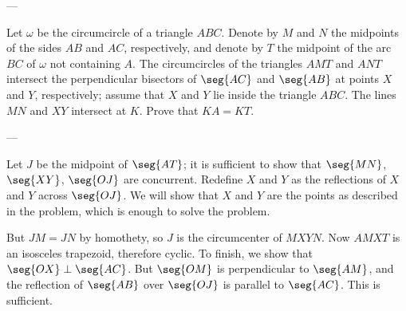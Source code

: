 
---

Let $\omega$ be the circumcircle of a triangle $ABC$. Denote by $M$ and $N$ the midpoints of the sides $AB$ and $AC$, respectively, and denote by $T$ the midpoint of the arc $BC$ of $\omega$ not containing $A$. The circumcircles of the triangles $AMT$ and $ANT$ intersect the perpendicular bisectors of $\seg{AC}$ and $\seg{AB}$ at points $X$ and $Y$, respectively; assume that $X$ and $Y$ lie inside the triangle $ABC$. The lines $MN$ and $XY$ intersect at $K$. Prove that $KA=KT$.

---

Let $J$ be the midpoint of $\seg{AT}$; it is sufficient to show that $\seg{MN}$, $\seg{XY}$, $\seg{OJ}$ are concurrent. Redefine $X$ and $Y$ as the reflections of $X$ and $Y$ across $\seg{OJ}$. We will show that $X$ and $Y$ are the points as described in the problem, which is enough to solve the problem.

But $JM=JN$ by homothety, so $J$ is the circumcenter of $MXYN$. Now $AMXT$ is an isosceles trapezoid, therefore cyclic. To finish, we show that $\seg{OX}\perp\seg{AC}$. But $\seg{OM}$ is perpendicular to $\seg{AM}$, and the reflection of $\seg{AB}$ over $\seg{OJ}$ is parallel to $\seg{AC}$. This is sufficient.

